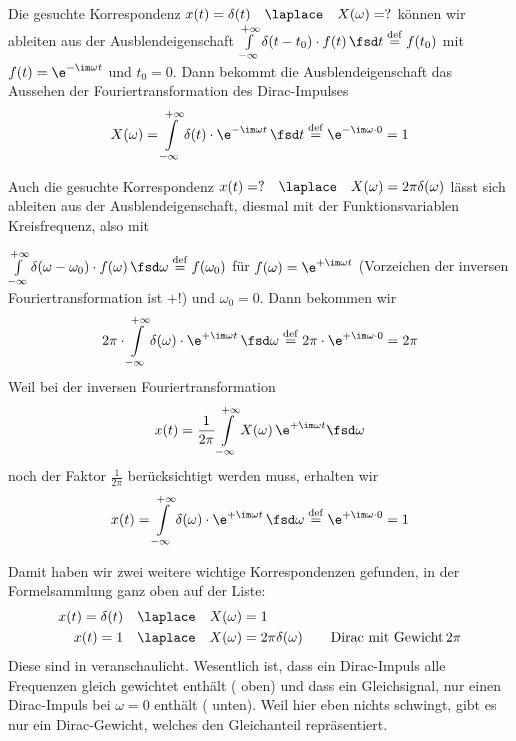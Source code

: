 \cleardoublepage
\begin{Ansatz}
Die gesuchte Korrespondenz $x(t)=\delta(t)\quad \laplace \quad X(\omega)=?$
können wir ableiten aus der Ausblendeigenschaft
$\int\limits_{-\infty}^{+\infty} \delta(t-t_0) \cdot f(t) \, \fsd t \stackrel{\mathrm{def}}= f(t_0)$
mit $f(t) = \e^{-\im \omega t}$ und $t_0=0$.
%
Dann bekommt die Ausblendeigenschaft das Aussehen der Fouriertransformation
des Dirac-Impulses
\begin{equation}
X(\omega) = \int\limits_{-\infty}^{+\infty} \delta(t) \cdot \e^{-\im \omega t} \, \fsd t \stackrel{\mathrm{def}}= \e^{-\im \omega \cdot 0} = 1
\end{equation}

Auch die gesuchte Korrespondenz
$x(t)= ? \quad \laplace \quad X(\omega)=2\pi \delta(\omega)$ lässt sich
ableiten aus der Ausblendeigenschaft, diesmal mit der Funktionsvariablen Kreisfrequenz, also mit

$\int\limits_{-\infty}^{+\infty} \delta(\omega-\omega_0) \cdot f(\omega) \, \fsd \omega \stackrel{\mathrm{def}}= f(\omega_0)$
für $f(\omega) = \e^{+\im \omega t}$ (Vorzeichen der inversen Fouriertransformation ist $+$!) und $\omega_0=0$.
%
Dann bekommen wir
\begin{equation}
2\pi \cdot \int\limits_{-\infty}^{+\infty} \delta(\omega) \cdot \e^{+\im \omega t} \, \fsd \omega \stackrel{\mathrm{def}}= 2\pi \cdot \e^{+\im \omega \cdot 0} = 2\pi
\end{equation}
%
Weil bei der inversen Fouriertransformation
\begin{align}
x(t) = \frac{1}{2\pi} \int\limits_{-\infty}^{+\infty} X(\omega) \, \e^{+\im \omega t} \fsd \omega
\end{align}
noch der Faktor $\frac{1}{2\pi}$ berücksichtigt werden muss, erhalten wir
\begin{equation}
x(t) = \int\limits_{-\infty}^{+\infty} \delta(\omega) \cdot \e^{+\im \omega t} \, \fsd \omega \stackrel{\mathrm{def}}= \e^{+\im \omega \cdot 0} = 1
\end{equation}

\end{Ansatz}
\begin{Loesung}
Damit haben wir zwei weitere wichtige Korrespondenzen gefunden, in der Formelsammlung
ganz oben auf der Liste:
\begin{align}
\label{eq:D410BDAAE0_Loesung1}
x(t)= \delta(t) &\quad \laplace \quad X(\omega)=1\\
\label{eq:D410BDAAE0_Loesung2}
x(t)= 1 &\quad \laplace \quad X(\omega)=2\pi \delta(\omega)\qquad \text{Dirac mit Gewicht}\,2\pi
\end{align}
%
Diese sind in  veranschaulicht.
%
Wesentlich ist, dass ein Dirac-Impuls alle Frequenzen gleich gewichtet enthält
( oben)
und dass ein Gleichsignal, nur einen Dirac-Impuls bei $\omega=0$ enthält
( unten).
Weil hier eben nichts schwingt, gibt es nur ein Dirac-Gewicht, welches den
Gleichanteil repräsentiert.
\end{Loesung}




